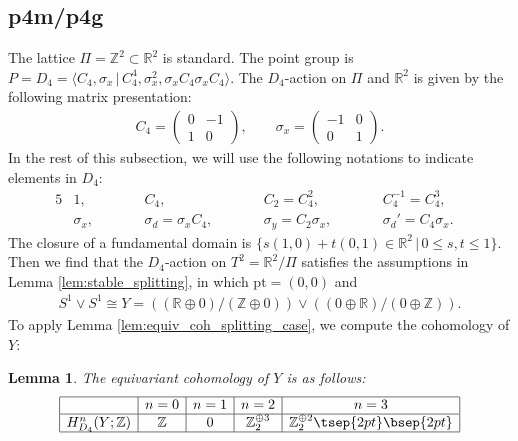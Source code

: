\documentclass[pdftex]{sigma}
\newtheorem{lem}[thm]{Lemma}
\theoremstyle{definition}
\newcommand{\R}{\mathbb{R}}
\newcommand{\Z}{\mathbb{Z}}
\newcommand{\pt}{\mathrm{pt}}
\begin{document}
\subsection{\textsf{p4m/p4g}}\label{subsec:p4m_p4g}

The lattice $\Pi = \Z^2 \subset \R^2$ is standard. The point group is
$P =D_4 =\langle C_4, \sigma_x \,|\, C_4^4, \sigma_x^2, \sigma_xC_4\sigma_xC_4 \rangle$. The $D_4$-action on $\Pi$ and $\R^2$ is given by the following matrix presentation:
\begin{gather*}
C_4 = \left(
\begin{matrix}
0 & -1\\
1 & 0
\end{matrix}
\right), \qquad \sigma_x =
\left(
\begin{matrix}
-1 & 0\\
0 & 1
\end{matrix}
\right).
\end{gather*}
In the rest of this subsection, we will use the following notations to indicate elements in $D_4$:
\begin{alignat*}{5}
&1, \qquad &&C_4, \qquad && C_2 = C_4^2, \qquad && C_4^{-1} = C_4^3,& \\
&\sigma_x, \qquad && \sigma_d = \sigma_x C_4,\qquad && \sigma_y = C_2\sigma_x, \qquad && \sigma_d' = C_4 \sigma_x.&
\end{alignat*}
The closure of a fundamental domain is $\{ s (1, 0) + t (0, 1) \in \R^2 \,|\, 0 \le s, t \le 1 \}$. Then we f\/ind that the $D_4$-action on $T^2 = \R^2/\Pi$ satisf\/ies the assumptions in Lemma \ref{lem:stable_splitting}, in which $\pt = (0, 0)$ and
\begin{gather*}
S^1 \vee S^1 \cong Y = ((\R \oplus 0)/(\Z \oplus 0)) \vee ((0 \oplus \R)/(0 \oplus \Z)).
\end{gather*}
To apply Lemma \ref{lem:equiv_coh_splitting_case}, we compute the cohomology of $Y$:

\begin{lem}
The equivariant cohomology of $Y$ is as follows:
$$
\begin{array}{|c|c|c|c|c|}
\hline
& n = 0 & n = 1 & n = 2 & n = 3 \\
\hline
H^n_{D_4}(Y; \Z) &
\Z & 0 & \Z_2^{\oplus 3} & \Z_2^{\oplus 2} \tsep{2pt}\bsep{2pt}\\
\hline
\end{array}
$$
\end{lem}
\end{document}
